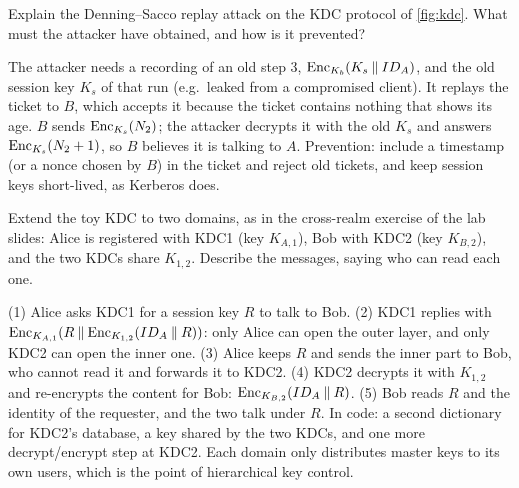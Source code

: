 \begin{exercise}
Explain the Denning--Sacco replay attack on the KDC protocol of \cref{fig:kdc}. What must the attacker have obtained, and how is it prevented?
\end{exercise}
\begin{solution}
The attacker needs a recording of an old step 3, $\operatorname{Enc}_{K_b}(K_s \mathbin{\|} ID_A)$, and the old session key $K_s$ of that run (e.g.\ leaked from a compromised client). It replays the ticket to $B$, which accepts it because the ticket contains nothing that shows its age. $B$ sends $\operatorname{Enc}_{K_s}(N_2)$; the attacker decrypts it with the old $K_s$ and answers $\operatorname{Enc}_{K_s}(N_2 + 1)$, so $B$ believes it is talking to $A$. Prevention: include a timestamp (or a nonce chosen by $B$) in the ticket and reject old tickets, and keep session keys short-lived, as Kerberos does.
\end{solution}

\begin{exercise}
Extend the toy KDC to two domains, as in the cross-realm exercise of the lab slides: Alice is registered with KDC1 (key $K_{A,1}$), Bob with KDC2 (key $K_{B,2}$), and the two KDCs share $K_{1,2}$. Describe the messages, saying who can read each one.
\end{exercise}
\begin{solution}
(1) Alice asks KDC1 for a session key $R$ to talk to Bob. (2) KDC1 replies with $\operatorname{Enc}_{K_{A,1}}(R \mathbin{\|} \operatorname{Enc}_{K_{1,2}}(ID_A \mathbin{\|} R))$: only Alice can open the outer layer, and only KDC2 can open the inner one. (3) Alice keeps $R$ and sends the inner part to Bob, who cannot read it and forwards it to KDC2. (4) KDC2 decrypts it with $K_{1,2}$ and re-encrypts the content for Bob: $\operatorname{Enc}_{K_{B,2}}(ID_A \mathbin{\|} R)$. (5) Bob reads $R$ and the identity of the requester, and the two talk under $R$. In code: a second dictionary for KDC2's database, a key shared by the two KDCs, and one more decrypt/encrypt step at KDC2. Each domain only distributes master keys to its own users, which is the point of hierarchical key control.
\end{solution}
